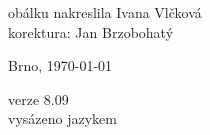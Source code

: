 \vspace*{\fill}
\hspace{10mm}obálku nakreslila Ivana Vlčková\\
korektura: Jan Brzobohatý\\
\begin{otherlanguage}{czech}
Brno, \today\\
\end{otherlanguage}
verze 8.09\\
vysázeno jazykem \LaTeXe
\vspace{2cm}
\newpage
